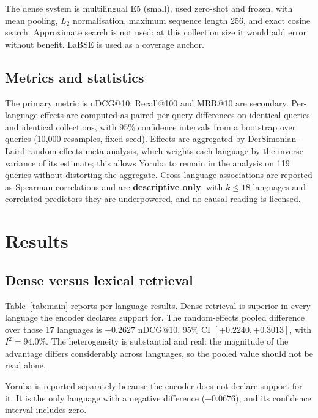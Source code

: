\documentclass{ijimai_article}
\begin{document}
The dense system is multilingual E5 (small), used zero-shot and frozen, with mean
pooling, $L_2$ normalisation, maximum sequence length 256, and exact cosine search.
Approximate search is not used: at this collection size it would add error without
benefit. LaBSE is used as a coverage anchor.

\subsection{Metrics and statistics}
The primary metric is nDCG@10; Recall@100 and MRR@10 are secondary. Per-language
effects are computed as paired per-query differences on identical queries and
identical collections, with 95\% confidence intervals from a bootstrap over
queries (10{,}000 resamples, fixed seed). Effects are aggregated by
DerSimonian--Laird random-effects meta-analysis, which weights each language by the
inverse variance of its estimate; this allows Yoruba to remain in the analysis on
119 queries without distorting the aggregate. Cross-language associations are
reported as Spearman correlations and are \textbf{descriptive only}: with
$k \le 18$ languages and correlated predictors they are underpowered, and no
causal reading is licensed.

\section{Results}

\subsection{Dense versus lexical retrieval}
Table~\ref{tab:main} reports per-language results. Dense retrieval is superior in
every language the encoder declares support for. The random-effects pooled
difference over those 17 languages is $+0.2627$ nDCG@10, 95\% CI
$[+0.2240, +0.3013]$, with $I^2 = 94.0\%$. The heterogeneity is substantial and
real: the magnitude of the advantage differs considerably across languages, so the
pooled value should not be read alone.

Yoruba is reported separately because the encoder does not declare support for it.
It is the only language with a negative difference ($-0.0676$), and its confidence
interval includes zero.
\end{document}
